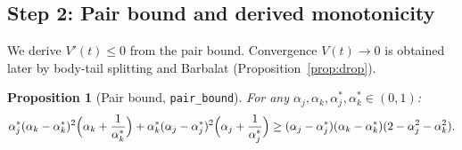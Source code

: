 \documentclass[11pt,a4paper]{article}
\newtheorem{proposition}[theorem]{Proposition}
\theoremstyle{definition}
\begin{document}
\subsection{Step 2: Pair bound and derived monotonicity}\label{sec:pair}

We derive $V'(t) \leq 0$ from the pair bound. Convergence $V(t) \to 0$ is obtained later by body-tail splitting and Barbalat (Proposition~\ref{prop:drop}).

\begin{proposition}[Pair bound, \texttt{pair\_bound}]\label{prop:pair}
For any $\alpha_j, \alpha_k, \alpha^*_j, \alpha^*_k \in (0,1)$:
\begin{equation}\label{eq:pair}
\alpha^*_j(\alpha_k - \alpha^*_k)^2\Bigl(\alpha_k + \frac{1}{\alpha^*_k}\Bigr) + \alpha^*_k(\alpha_j - \alpha^*_j)^2\Bigl(\alpha_j + \frac{1}{\alpha^*_j}\Bigr) \geq (\alpha_j - \alpha^*_j)(\alpha_k - \alpha^*_k)(2 - \alpha_j^2 - \alpha_k^2).
\end{equation}
\end{proposition}
\end{document}
